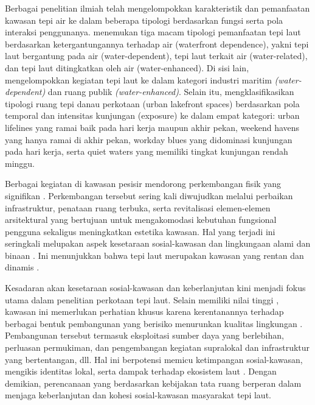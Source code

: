 \documentclass[../riset_senja.tex]{subfiles}
\begin{document}
Berbagai penelitian ilmiah telah mengelompokkan karakteristik dan pemanfaatan kawasan tepi air ke dalam beberapa tipologi berdasarkan fungsi serta pola interaksi penggunanya.
\citet{xing2025} menemukan tiga macam tipologi pemanfaatan tepi laut berdasarkan ketergantungannya terhadap air (waterfront dependence), yakni tepi laut bergantung pada air (water-dependent), tepi laut terkait air (water-related), dan tepi laut ditingkatkan oleh air (water-enhanced).
Di sisi lain, \citet{hoppe2011} mengelompokkan kegiatan tepi laut ke dalam kategori industri maritim \textit{(water-dependent)} dan ruang publik \textit{(water-enhanced)}.
%
Selain itu, \citet{shi2025} mengklasifikasikan tipologi ruang tepi danau perkotaan (urban lakefront spaces) berdasarkan pola temporal dan intensitas kunjungan (exposure) ke dalam empat kategori: urban lifelines yang ramai baik pada hari kerja maupun akhir pekan, weekend havens yang hanya ramai di akhir pekan, workday blues yang didominasi kunjungan pada hari kerja, serta quiet waters yang memiliki tingkat kunjungan rendah  minggu.


Berbagai kegiatan di kawasan pesisir mendorong perkembangan fisik yang signifikan \citep{theodora2022, chen2026} . Perkembangan tersebut sering kali diwujudkan melalui perbaikan infrastruktur, penataan ruang terbuka, serta revitalisasi elemen-elemen arsitektural yang bertujuan untuk mengakomodasi kebutuhan fungsional pengguna sekaligus meningkatkan estetika kawasan. Hal yang terjadi ini seringkali melupakan aspek kesetaraan sosial-kawasan  dan lingkungaan alami dan binaan \citep{yousofpour2024, chen2026}. Ini menunjukkan bahwa tepi laut merupakan kawasan yang rentan dan dinamis \citep{theodora2022}.

Kesadaran akan kesetaraan sosial-kawasan dan keberlanjutan kini menjadi fokus utama dalam penelitian perkotaan tepi laut. Selain memiliki nilai tinggi \citep{chen2026}, kawasan ini memerlukan perhatian khusus karena kerentanannya terhadap berbagai bentuk pembangunan yang berisiko menurunkan kualitas lingkungan \citep{theodora2022}. Pembangunan tersebut termasuk eksploitasi sumber daya yang berlebihan, perluasan permukiman, dan pengembangan kegiatan supralokal dan infrastruktur yang bertentangan, dll. Hal ini berpotensi memicu ketimpangan sosial-kawasan, mengikis identitas lokal, serta dampak terhadap ekosistem laut \citep{theodora2022}. Dengan demikian, perencanaan yang berdasarkan kebijakan tata ruang berperan dalam menjaga keberlanjutan dan kohesi sosial-kawasan masyarakat tepi laut.
\end{document}
